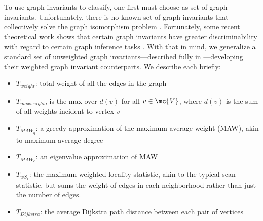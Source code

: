 \documentclass[10pt,journal,cspaper,compsoc]{IEEEtran}
\begin{document}
To use graph invariants to classify, one first must choose as set of graph invariants.  Unfortunately, there is no known set of graph invariants that collectively solve the graph isomorphism problem \cite{Conte2004}.  Fortunately, some recent theoretical work shows that certain graph invariants have greater discriminability with regard to certain graph inference tasks \cite{Ruhkhin2011}. With that in mind, we generalize a standard set of unweighted graph invariants---described fully in \cite{CPP11}---developing their weighted graph invariant counterparts. We describe each briefly:
\begin{itemize}
	\item $T_{weight}$: total weight of all the edges in the graph
	\item $T_{maxweight}$, is the max over $d(v)$ for all $v \in \mc{V}$, where $d(v)$ is the sum of all weights incident to vertex $v$	
	\item $T_{MAW_g}$: a greedy approximation of the maximum average weight (MAW), akin to maximum average degree
	\item $T_{MAW_e}$: an eigenvalue approximation of MAW
	\item $T_{wS_1}$: the maximum weighted locality statistic, akin to the typical scan statistic, but sums the weight of edges in each neighborhood rather than just the number of edges.
	\item $T_{Dijkstra}$: the average Dijkstra path distance between each pair of vertices
\end{itemize}
\end{document}

